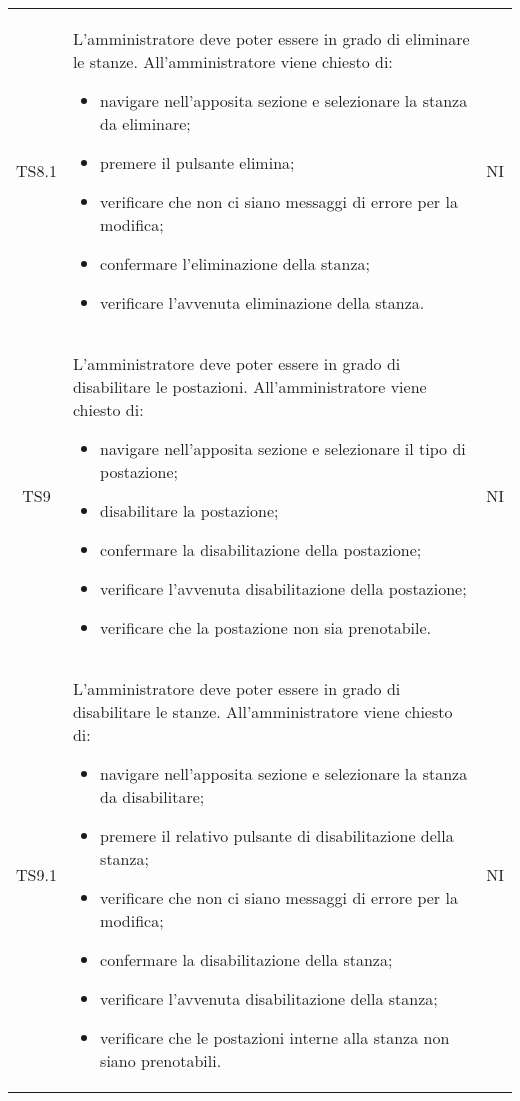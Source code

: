 {\begin{longtable}{ c C{11cm} c }
        TS8.1&
        \begin{flushleft}
            L'amministratore deve poter essere in grado di eliminare le stanze.
            All'amministratore viene chiesto di:
        \end{flushleft}
        \begin{itemize}
            \item navigare nell'apposita sezione e selezionare la stanza da eliminare;
            \item premere il pulsante elimina;
            \item verificare che non ci siano messaggi di errore per la modifica;
            \item confermare l'eliminazione della stanza;
            \item verificare l'avvenuta eliminazione della stanza.
        \end{itemize}&
        NI\\

        TS9&
        \begin{flushleft}
            L'amministratore deve poter essere in grado di disabilitare le postazioni.
            All'amministratore viene chiesto di:
        \end{flushleft}
        \begin{itemize}
            \item navigare nell'apposita sezione e selezionare il tipo di postazione;
            \item disabilitare la postazione;
            \item confermare la disabilitazione della postazione;
            \item verificare l'avvenuta disabilitazione della postazione;
            \item verificare che la postazione non sia prenotabile.
        \end{itemize}&
        NI\\

        TS9.1&
        \begin{flushleft}
            L'amministratore deve poter essere in grado di disabilitare le stanze.
            All'amministratore viene chiesto di:
        \end{flushleft}
        \begin{itemize}
            \item navigare nell'apposita sezione e selezionare la stanza da disabilitare;
            \item premere il relativo pulsante di disabilitazione della stanza;
            \item verificare che non ci siano messaggi di errore per la modifica;
            \item confermare la disabilitazione della stanza;
            \item verificare l'avvenuta disabilitazione della stanza;
            \item verificare che le postazioni interne alla stanza non siano prenotabili.
        \end{itemize}&
        NI\\



\end{longtable}}
